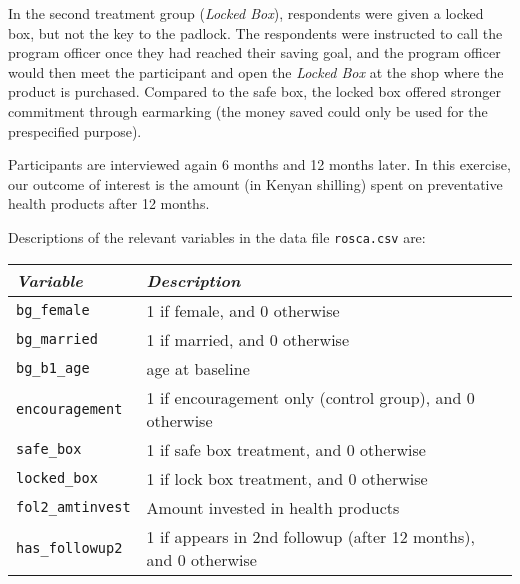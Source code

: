 \documentclass[11pt]{article}
\begin{document}
In the second treatment group (\textit{Locked Box}), respondents were given a locked box, but not the key to the padlock. The respondents were instructed to call the program officer once they had reached their saving goal, and the program officer would then meet the participant and open the \textit{Locked Box} at the shop where the product is purchased. Compared to the safe box, the locked box offered stronger commitment through earmarking (the money saved could only be used for the prespecified purpose). 

Participants are interviewed again 6 months and 12 months later. In this exercise, our outcome of interest is the amount (in Kenyan shilling) spent on preventative health products after 12 months.

Descriptions of the relevant variables in the data file {\tt rosca.csv} are:\vspace{1mm}
\begin{center}
\begin{tabular}{l p{11cm}}
 \hline
\textit{Variable} & \textit{Description} \\
\hline
{\tt bg_female} &                      1 if female, and 0 otherwise \\
{\tt bg_married} &                     1 if married, and 0 otherwise \\
{\tt bg_b1_age} &                      age at baseline \\
{\tt encouragement} &                  1 if encouragement only (control group), and 0 otherwise \\
{\tt safe_box} &                       1 if safe box treatment, and 0 otherwise \\
{\tt locked_box} &                     1 if lock box treatment, and 0 otherwise \\
{\tt fol2_amtinvest}      &           Amount invested in health products \\         
{\tt has_followup2} &                 1 if appears in 2nd followup (after 12 months), and 0 otherwise \\
\hline
\end{tabular}
\end{center}
\vspace{1mm}
\end{document}
